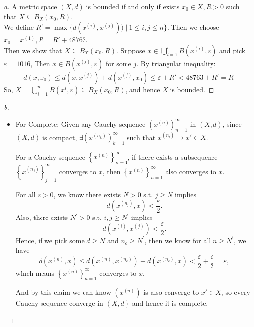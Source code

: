 \begin{proof}[a]
    A metric space $(X,d)$ is bounded if and only if exists $x_0 \in X, R > 0$ such that $X \subseteq B_X(x_0, R)$. \\
    We define $R' = \max\{d(x^{(i)},x^{(j)})) \mid 1 \leq i,j \leq n\}$. Then we choose $x_0 = x^{(1)}, R = R' + 48763$. \\
    Then we show that $X \subseteq B_X(x_0, R)$. Suppose $x \in \bigcup_{i=1}^{n} B(x^{(i)}, \varepsilon)$ and pick $\varepsilon = 1016$, Then $x \in B(x^{(j)}, \varepsilon)$ for some $j$.
    By triangular inequality:
    \[
    d(x, x_0) \leq d(x, x^{(j)}) + d(x^{(j)}, x_0) \leq \varepsilon + R' < 48763 + R' = R
    \]
    So, $X = \bigcup_{i=1}^{n} B(x^{i}, \varepsilon)\subseteq B_X(x_0, R)$, and hence $X$ is bounded.
\end{proof}
\begin{proof}[b]
    \vphantom{text}
    \begin{itemize}
        \item For Complete: Given any Cauchy sequence $(x^{(n)})_{n=1}^{\infty}$ in $(X, d)$, since $(X, d)$ is compact, $\exists (x^{(n_k)})_{k=1}^{\infty}$ such that $x^{(n_j)} \to x' \in X$. 
        \begin{claim}
            For a Cauchy sequence \(\left\{ x^{(n)} \right\}_{n=1}^{\infty}  \), if there exists a subsequence \(\left\{ x^{(n_j)} \right\}_{j=1}^{\infty}  \) converges to \(x\), then \(\left\{ x^{(n)} \right\}_{n=1}^{\infty}  \) also converges to \(x\).
        \end{claim}
        \begin{explanation}
            For all \(\varepsilon > 0\), we know there exists \(N > 0\) s.t. \(j \ge N\) implies 
            \[
                d\left( x^{(n_j)}, x \right) < \frac{\varepsilon}{2}. 
            \]  
            Also, there exists \(N^{\prime} > 0\) s.t. \(i, j \ge N^{\prime} \) implies
            \[
                d\left( x^{(i)}, x^{(j)} \right) < \frac{\varepsilon}{2}. 
            \]  
            Hence, if we pick some \(d \ge N\) and \(n_d \ge N^{\prime} \), then we know for all \(n \ge N^{\prime} \), we have 
            \[
                d \left( x^{(n)}, x \right) \le d \left( x^{(n)}, x^{(n_d)} \right) + d \left( x^{(n_d)}, x \right) < \frac{\varepsilon}{2} + \frac{\varepsilon}{2} = \varepsilon,
            \] which means \(\left\{ x^{(n)} \right\}_{n=1}^{\infty}  \) converges to \(x\).
        \end{explanation}
        And by this claim we can know $(x^{(n)})$ is also converge to $x' \in X$, so every Cauchy sequence converge in $(X, d)$ and hence it is complete.


\end{itemize}
\end{proof}
